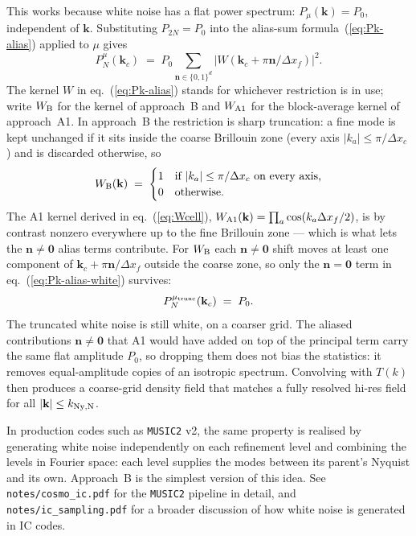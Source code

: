 \documentclass[12pt]{article}
\newcommand{\notecosmoic}{\texttt{notes/cosmo\_ic.pdf}\xspace}
\newcommand{\noteicsampling}{\texttt{notes/ic\_sampling.pdf}\xspace}
\begin{document}
This works because white noise has a flat power spectrum:
$P_\mu(\mathbf k)=P_0$, independent of $\mathbf k$. Substituting
$P_{2N}=P_0$ into the alias-sum formula~(\ref{eq:Pk-alias}) applied
to $\mu$ gives
\begin{equation}\label{eq:Pk-alias-white}
  P_N^\mu(\mathbf k_c) \;=\; P_0\sum_{\mathbf n\in\{0,1\}^d}
        \bigl|W(\mathbf k_c+\pi\mathbf n/\Delta x_f)\bigr|^2.
\end{equation}
The kernel $W$ in eq.~(\ref{eq:Pk-alias}) stands for whichever
restriction is in use; write $W_{\rm B}$ for the kernel of approach~B
and $W_{\rm A1}$ for the block-average kernel of approach~A1. In
approach~B the restriction is sharp truncation: a fine mode is kept
unchanged if it sits inside the coarse Brillouin zone (every axis
$|k_a|\le\pi/\Delta x_c$) and is discarded otherwise, so
\begin{equation*}
  W_{\rm B}(\mathbf k) \;=\; \begin{cases}
    1 & \text{if } |k_a|\le\pi/\Delta x_c \text{ on every axis,}\\
    0 & \text{otherwise.}
  \end{cases}
\end{equation*}
The A1 kernel derived in eq.~(\ref{eq:Wcell}),
$W_{\rm A1}(\mathbf k)=\prod_a\cos(k_a\Delta x_f/2)$, is by contrast
nonzero everywhere up to the fine Brillouin zone --- which is what
lets the $\mathbf n\ne\mathbf 0$ alias terms contribute. For
$W_{\rm B}$ each $\mathbf n\ne\mathbf 0$ shift moves at least one
component of $\mathbf k_c+\pi\mathbf n/\Delta x_f$ outside the coarse
zone, so only the $\mathbf n=\mathbf 0$ term in
eq.~(\ref{eq:Pk-alias-white}) survives:
\begin{equation}\label{eq:Pk-alias-white-truncated}
  P_N^{\mu_{\rm trunc}}(\mathbf k_c) \;=\; P_0 .
\end{equation}
The truncated white noise is still white, on a coarser grid. The
aliased contributions $\mathbf n\ne\mathbf 0$ that A1 would have added
on top of the principal term carry the same flat amplitude $P_0$, so
dropping them does not bias the statistics: it removes equal-amplitude
copies of an isotropic spectrum. Convolving with $T(k)$ then produces
a coarse-grid density field that matches a fully resolved hi-res field
for all $|\mathbf k|\le k_{\rm Ny,N}$.

In production codes such as \texttt{MUSIC2} v2, the same property is
realised by generating white noise independently on each refinement
level and combining the levels in Fourier space: each level supplies
the modes between its parent's Nyquist and its own. Approach~B is the
simplest version of this idea. See \notecosmoic for
the \texttt{MUSIC2} pipeline in detail, and
\noteicsampling for a broader discussion of how white
noise is generated in IC codes.
\end{document}
